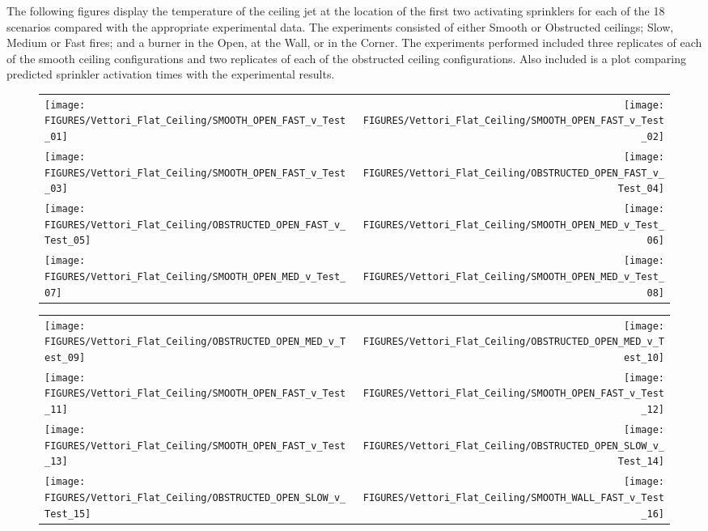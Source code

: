 The following figures display the temperature of the ceiling jet at the location of the first two activating sprinklers for each of the 18 scenarios compared
with the appropriate experimental data. The
experiments consisted of either Smooth or Obstructed ceilings; Slow, Medium or Fast fires; and a burner in the Open, at the Wall, or in the Corner.
The experiments performed included three replicates of each of the smooth ceiling configurations and two replicates of each of the obstructed ceiling configurations.
Also included is a plot comparing predicted sprinkler activation times with the experimental results.


\begin{figure}[p]
\begin{tabular*}{\textwidth}{l@{\extracolsep{\fill}}r}
\texttt{[image: FIGURES/Vettori\_Flat\_Ceiling/SMOOTH\_OPEN\_FAST\_v\_Test\_01]} &
\texttt{[image: FIGURES/Vettori\_Flat\_Ceiling/SMOOTH\_OPEN\_FAST\_v\_Test\_02]} \\
\texttt{[image: FIGURES/Vettori\_Flat\_Ceiling/SMOOTH\_OPEN\_FAST\_v\_Test\_03]} &
\texttt{[image: FIGURES/Vettori\_Flat\_Ceiling/OBSTRUCTED\_OPEN\_FAST\_v\_Test\_04]} \\
\texttt{[image: FIGURES/Vettori\_Flat\_Ceiling/OBSTRUCTED\_OPEN\_FAST\_v\_Test\_05]} &
\texttt{[image: FIGURES/Vettori\_Flat\_Ceiling/SMOOTH\_OPEN\_MED\_v\_Test\_06]} \\
\texttt{[image: FIGURES/Vettori\_Flat\_Ceiling/SMOOTH\_OPEN\_MED\_v\_Test\_07]} &
\texttt{[image: FIGURES/Vettori\_Flat\_Ceiling/SMOOTH\_OPEN\_MED\_v\_Test\_08]} \\
\end{tabular*}
\label{Vettori_1}
\end{figure}

\begin{figure}[p]
\begin{tabular*}{\textwidth}{l@{\extracolsep{\fill}}r}
\texttt{[image: FIGURES/Vettori\_Flat\_Ceiling/OBSTRUCTED\_OPEN\_MED\_v\_Test\_09]} &
\texttt{[image: FIGURES/Vettori\_Flat\_Ceiling/OBSTRUCTED\_OPEN\_MED\_v\_Test\_10]} \\
\texttt{[image: FIGURES/Vettori\_Flat\_Ceiling/SMOOTH\_OPEN\_FAST\_v\_Test\_11]} &
\texttt{[image: FIGURES/Vettori\_Flat\_Ceiling/SMOOTH\_OPEN\_FAST\_v\_Test\_12]} \\
\texttt{[image: FIGURES/Vettori\_Flat\_Ceiling/SMOOTH\_OPEN\_FAST\_v\_Test\_13]} &
\texttt{[image: FIGURES/Vettori\_Flat\_Ceiling/OBSTRUCTED\_OPEN\_SLOW\_v\_Test\_14]} \\
\texttt{[image: FIGURES/Vettori\_Flat\_Ceiling/OBSTRUCTED\_OPEN\_SLOW\_v\_Test\_15]} &
\texttt{[image: FIGURES/Vettori\_Flat\_Ceiling/SMOOTH\_WALL\_FAST\_v\_Test\_16]} \\
\end{tabular*}
\label{Vettori_2}
\end{figure}

